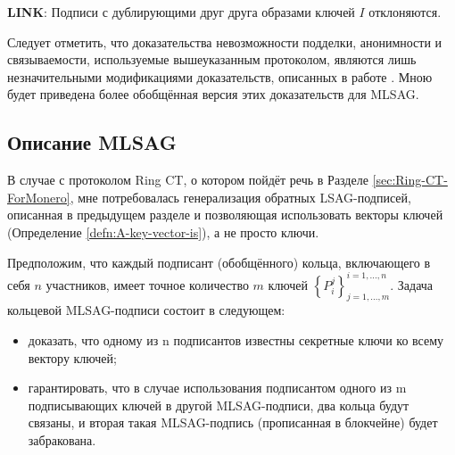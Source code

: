 \documentclass{mrl}
\theoremstyle{definition}
\numberwithin{thm}{section}
\begin{document}
\textbf{LINK}: Подписи с дублирующими друг друга образами ключей $I$ отклоняются.

Следует отметить, что доказательства невозможности подделки, анонимности и связываемости, используемые вышеуказанным протоколом, являются лишь незначительными модификациями доказательств, описанных в работе \cite{LWW}. Мною будет приведена более обобщённая версия этих доказательств для MLSAG.

\subsection{\label{sub:MLSAG-Description}Описание MLSAG}

В случае с протоколом Ring CT, о котором пойдёт речь в Разделе \ref{sec:Ring-CT-ForMonero}, мне потребовалась генерализация обратных LSAG-подписей, описанная в предыдущем разделе и позволяющая использовать векторы ключей (Определение \ref{defn:A-key-vector-is}), а не просто ключи.

Предположим, что каждый подписант (обобщённого) кольца, включающего в себя $n$ участников, имеет точное количество $m$ ключей $\left\{ P_{i}^{j}\right\} _{j=1,...,m}^{i=1,...,n}$.
Задача кольцевой MLSAG-подписи состоит в следующем:
\begin{itemize}
\item доказать, что одному из n подписантов известны секретные ключи ко всему вектору ключей;
\item гарантировать, что в случае использования подписантом одного из m подписывающих ключей в другой MLSAG-подписи, два кольца будут связаны, и вторая такая MLSAG-подпись (прописанная в блокчейне) будет забракована.
\end{itemize}
\end{document}
